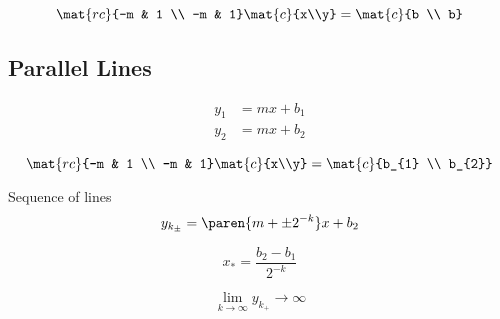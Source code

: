   \begin{equation*}   %
    \mat{rc}{-m & 1 \\ -m & 1} \mat{c}{x\\y} = \mat{c}{b \\ b}
  \end{equation*}

\subsection{Parallel Lines}  %

  \begin{equation*}   %
    \begin{split}
      y_{1} &= mx + b_{1} \\
      y_{2} &= mx + b_{2}
    \end{split}
  \end{equation*}

  \begin{equation*}   %
    \mat{rc}{-m & 1 \\ -m & 1} \mat{c}{x\\y} = \mat{c}{b_{1} \\ b_{2}}
  \end{equation*}
  
  Sequence of lines
  \begin{equation*}   %
    y_{k_{\pm}} = \paren{m + \pm 2^{-k}}x + b_{2}
  \end{equation*}

  \begin{equation*}   %
    x_{*} = \frac{b_{2} - b_{1}} {2^{-k}}
  \end{equation*}

  \begin{equation*}   %
    \lim_{k\to\infty} y_{k_{+}} \to \infty
  \end{equation*}

